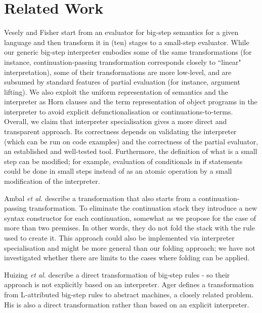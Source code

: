 \documentclass{llncs}
\newcommand{\keyword}[1]{\mathsf{#1}}
\begin{document}
\section{Related Work}
Vesely and Fisher \cite{VeselyF19} start from an evaluator for big-step semantics 
for a given language and then
transform it in (ten) stages to a small-step evaluator.  While our generic big-step interpreter embodies some of the same transformations (for instance,
continuation-passing transformation corresponds closely to ``linear" interpretation), some of their transformations are more low-level,
and are subsumed by standard features of partial evaluation (for instance, argument lifting).  We also exploit the uniform 
representation of semantics and the interpreter as Horn clauses and the term representation of object programs in the interpreter to avoid
explicit defunctionalisation or continuations-to-terms. Overall, we claim that interpreter specialisation gives a more direct and
transparent approach. Its correctness depends on validating the interpreter (which can be run on code examples)
and the correctness of the partial evaluator, an established and well-tested tool.  Furthermore, the definition of what is a small step can be
modified;  for example, evaluation of conditionals in $\keyword{if}$ statements could be done in small steps instead of as an atomic operation
by a small modification of the interpreter.

Ambal \emph{et al.} \cite{AmbalLSN22} describe a transformation that also starts from a continuation-passing transformation. To eliminate the 
continuation stack they introduce a new syntax constructor for each continuation, somewhat as we propose for the case of more than two premises.
In other words, they do not fold the stack with the rule used to create it.  This approach could also be implemented via interpreter specialisation
and might be more general than our folding approach;  we have not investigated whether there are limits to the cases where folding can be applied.

Huizing \emph{et al.} \cite{HuizingKK10} describe a direct transformation of big-step rules - so their approach is not explicitly based
on an interpreter.  Ager \cite{Ager04} defines a transformation from L-attributed big-step rules to abstract machines, a closely related problem.  His is
also a direct transformation rather than based on an explicit interpreter.  




\newpage
\appendix

\newpage

\end{document}

